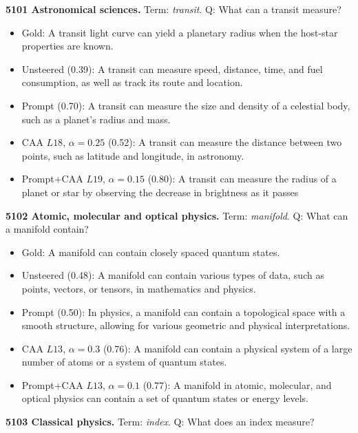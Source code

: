 \medskip\noindent\textbf{5101 Astronomical sciences.} Term: \emph{transit}.
Q: What can a transit measure?
\begin{itemize}\setlength{\itemsep}{0.15em}\setlength{\parsep}{0pt}\setlength{\topsep}{0.2em}
\item Gold: A transit light curve can yield a planetary radius when the host-star properties are known.
\item Unsteered (0.39): A transit can measure speed, distance, time, and fuel consumption, as well as track its route and location.
\item Prompt (0.70): A transit can measure the size and density of a celestial body, such as a planet's radius and mass.
\item CAA $L18$, $\alpha=0.25$ (0.52): A transit can measure the distance between two points, such as latitude and longitude, in astronomy.
\item Prompt+CAA $L19$, $\alpha=0.15$ (0.80): A transit can measure the radius of a planet or star by observing the decrease in brightness as it passes
\end{itemize}
\medskip\noindent\textbf{5102 Atomic, molecular and optical physics.} Term: \emph{manifold}.
Q: What can a manifold contain?
\begin{itemize}\setlength{\itemsep}{0.15em}\setlength{\parsep}{0pt}\setlength{\topsep}{0.2em}
\item Gold: A manifold can contain closely spaced quantum states.
\item Unsteered (0.48): A manifold can contain various types of data, such as points, vectors, or tensors, in mathematics and physics.
\item Prompt (0.50): In physics, a manifold can contain a topological space with a smooth structure, allowing for various geometric and physical interpretations.
\item CAA $L13$, $\alpha=0.3$ (0.76): A manifold can contain a physical system of a large number of atoms or a system of quantum states.
\item Prompt+CAA $L13$, $\alpha=0.1$ (0.77): A manifold in atomic, molecular, and optical physics can contain a set of quantum states or energy levels.
\end{itemize}
\medskip\noindent\textbf{5103 Classical physics.} Term: \emph{index}.
Q: What does an index measure?
